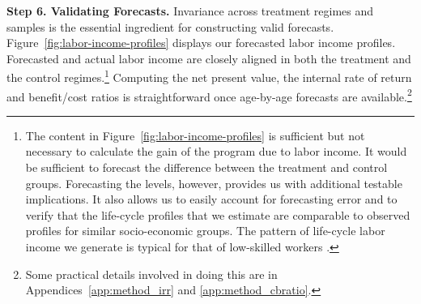 \textbf{Step 6. Validating Forecasts.} Invariance across treatment regimes and samples is the essential ingredient for constructing valid forecasts. Figure~\ref{fig:labor-income-profiles} displays our forecasted labor income profiles. Forecasted and actual labor income are closely aligned in both the treatment and the control regimes.\footnote{The content in Figure~\ref{fig:labor-income-profiles} is sufficient but not necessary to calculate the gain of the program due to labor income. It would be sufficient to forecast the difference between the treatment and control groups. Forecasting the levels, however, provides us with additional testable implications. It also allows us to easily account for forecasting error and to verify that the life-cycle profiles that we estimate are comparable to observed profiles for similar socio-economic groups. The pattern of life-cycle labor income we generate is typical for that of low-skilled workers \citep{Blundell-etal_2015_J-Pub-E,Gladden_Taber_2000_WageProgression,Sanders-Taber_2012_AR,Lagakos_Moll_etal_2016_LifeCycle_NBER}.} Computing the net present value, the internal rate of return and benefit/cost ratios is straightforward once age-by-age forecasts are available.\footnote{Some practical details involved in doing this are in Appendices~\ref{app:method_irr} and \ref{app:method_cbratio}.}

